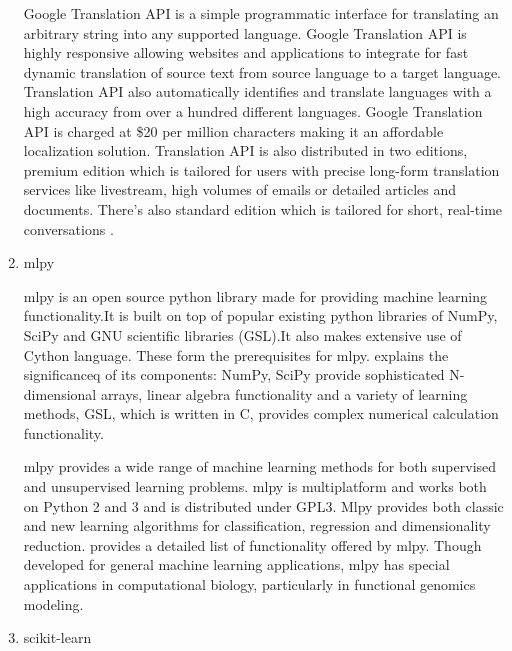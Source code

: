 \begin{enumerate}
Google Translation API is a simple programmatic interface for
translating an arbitrary string into any supported
language. Google Translation API is highly responsive allowing
websites and applications to integrate for fast dynamic
translation of source text from source language to a target
language. Translation API also automatically identifies and
translate languages with a high accuracy from over a hundred
different languages.  Google Translation API is charged at \$20 per
million characters making it an affordable localization
solution. Translation API is also distributed in two editions,
premium edition which is tailored for users with precise long-form
translation services like livestream, high volumes of emails or
detailed articles and documents. There’s also standard edition
which is tailored for short, real-time
conversations \label{\detokenize{i524/technologies:id89}}{\hyperref[\detokenize{i524/technologies:www-translation}]{\sphinxcrossref{{[}80{]}}}}.

\item {} 
mlpy

mlpy is an open source python library made for providing machine
learning functionality.It is built on top of popular existing
python libraries of NumPy, SciPy and GNU scientific libraries
(GSL).It also makes extensive use of Cython language. These form
the prerequisites for
mlpy. \label{\detokenize{i524/technologies:id90}}{\hyperref[\detokenize{i524/technologies:dblp-journals-corr-abs-1202-6548}]{\sphinxcrossref{{[}81{]}}}} explains the
significanceq of its components: NumPy, SciPy provide
sophisticated N-dimensional arrays, linear algebra functionality
and a variety of learning methods, GSL, which is written in C,
provides complex numerical calculation functionality.

mlpy provides a wide range of machine learning methods for both
supervised and unsupervised learning problems. mlpy is multiplatform
and works both on Python 2 and 3 and is distributed under GPL3. Mlpy
provides both classic and new learning algorithms for classification,
regression and dimensionality reduction. \label{\detokenize{i524/technologies:id91}}{\hyperref[\detokenize{i524/technologies:www-mlpy}]{\sphinxcrossref{{[}82{]}}}}
provides a detailed list of functionality offered by mlpy. Though
developed for general machine learning applications, mlpy has special
applications in computational biology, particularly in functional
genomics modeling.

\item {} 
scikit-learn


\end{enumerate}
